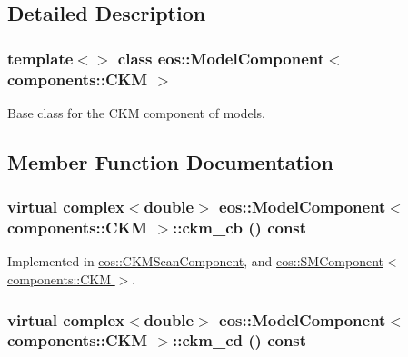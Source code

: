 \subsection{Detailed Description}
\subsubsection*{template$<$$>$ class eos::ModelComponent$<$ components::CKM $>$}

Base class for the CKM component of models. 

\subsection{Member Function Documentation}
\hypertarget{classeos_1_1ModelComponent_3_01components_1_1CKM_01_4_aacb78ba3cf4df16bff0c6b6289b1a955}{
\subsubsection[{ckm\_\-cb}]{\setlength{\rightskip}{0pt plus 5cm}virtual complex$<$double$>$ eos::ModelComponent$<$ components::CKM $>$::ckm\_\-cb () const}}
\label{classeos_1_1ModelComponent_3_01components_1_1CKM_01_4_aacb78ba3cf4df16bff0c6b6289b1a955}


Implemented in \hyperlink{classeos_1_1CKMScanComponent_a420671fc6106cda58d97d82af85dddf3}{eos::CKMScanComponent}, and \hyperlink{classeos_1_1SMComponent_3_01components_1_1CKM_01_4_a001e9ea6af4bcd20dde06bf894d3cbb5}{eos::SMComponent$<$ components::CKM $>$}.\hypertarget{classeos_1_1ModelComponent_3_01components_1_1CKM_01_4_a91f57e4ea6a4072d25e533a424cb0373}{
\subsubsection[{ckm\_\-cd}]{\setlength{\rightskip}{0pt plus 5cm}virtual complex$<$double$>$ eos::ModelComponent$<$ components::CKM $>$::ckm\_\-cd () const}}
\label{classeos_1_1ModelComponent_3_01components_1_1CKM_01_4_a91f57e4ea6a4072d25e533a424cb0373}


